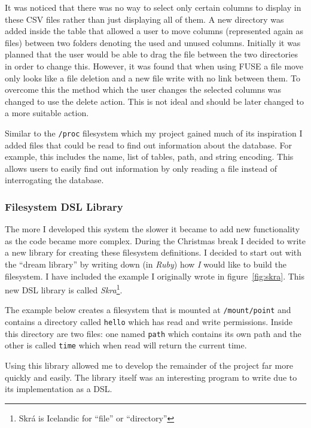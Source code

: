 It was noticed that there was no way to select only certain columns to display
in these CSV files rather than just displaying all of them. A new directory was
added inside the table that allowed a user to move columns (represented again
as files) between two folders denoting the used and unused columns. Initially
it was planned that the user would be able to drag the file between the two
directories in order to change this. However, it was found that when using
\ac{FUSE} a file move only looks like a file deletion and a new file write with
no link between them. To overcome this the method which the user changes the
selected columns was changed to use the delete action. This is not ideal and
should be later changed to a more suitable action.

Similar to the \texttt{/proc} filesystem which my project gained much of its
inspiration I added files that could be read to find out information about the
database. For example, this includes the name, list of tables, path, and string
encoding. This allows users to easily find out information by only reading
a file instead of interrogating the database.

\subsubsection{Filesystem DSL Library}

The more I developed this system the slower it became to add new functionality
as the code became more complex. During the Christmas break I decided to write
a new library for creating these filesystem definitions. I decided to start out
with the ``dream library'' by writing down (in \emph{Ruby}) how \emph{I} would
like to build the filesystem. I have included the example I originally wrote in
figure~\ref{fig:skra}. This new \ac{DSL} library is called
\emph{Skra}\footnote{Skr\'{a} is Icelandic for ``file'' or ``directory''}.

The example below creates a filesystem that is mounted at \texttt{/mount/point}
and contains a directory called \texttt{hello} which has read and write
permissions. Inside this directory are two files: one named \texttt{path} which
contains its own path and the other is called \texttt{time} which when read
will return the current time.

Using this library allowed me to develop the remainder of the project far more
quickly and easily. The library itself was an interesting program to write due
to its implementation as a DSL.

